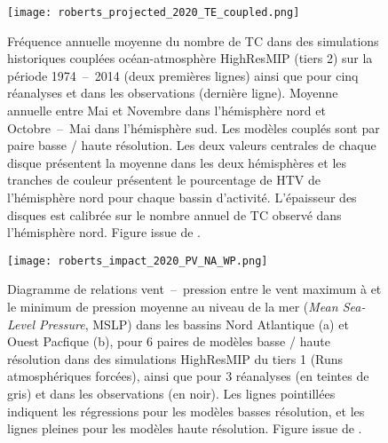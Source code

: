 \documentclass[../main.tex]{subfiles}
\begin{document}
\begin{figure}[tb]
    \centering
    \texttt{[image: roberts\_projected\_2020\_TE\_coupled.png]}
    \caption{Fréquence annuelle moyenne du nombre de TC dans des simulations historiques couplées océan-atmosphère HighResMIP (tiers 2) sur la période
        \num{1974}~--~\num{2014} (deux premières lignes) ainsi que pour cinq réanalyses et dans les observations (dernière ligne). Moyenne annuelle entre Mai et
        Novembre dans l'hémisphère nord et Octobre~--~Mai dans l'hémisphère sud. Les modèles couplés sont par paire basse / haute résolution. Les deux valeurs
        centrales de chaque disque présentent la moyenne dans les deux hémisphères et les tranches de couleur présentent le pourcentage de HTV de l'hémisphère
        nord pour chaque bassin d'activité. L'épaisseur des disques est calibrée sur le nombre annuel de TC observé dans l'hémisphère nord. Figure issue de
        \hbox{\cite{roberts_projected_2020}}.}
        \label{fig:NTC_HighResMIP}
\end{figure}
\begin{figure}[tb]
    \centering
    \texttt{[image: roberts\_impact\_2020\_PV\_NA\_WP.png]}
    \caption{Diagramme de relations vent~--~pression entre le vent maximum à  et le minimum de pression moyenne au niveau de la mer (\textit{Mean
        Sea-Level Pressure}, MSLP) dans les bassins Nord Atlantique (a) et Ouest Pacfique (b), pour \num{6} paires de modèles basse / haute résolution dans des
        simulations HighResMIP du tiers \num{1} (Runs atmosphériques forcées), ainsi que pour \num{3} réanalyses (en teintes de gris) et dans les observations
        (en noir). Les lignes pointillées indiquent les régressions pour les modèles basses résolution, et les lignes pleines pour les modèles haute résolution.
        Figure issue de \hbox{\cite{roberts_impact_2020}}.}
    \label{fig:roberts_PV_resolution}
\end{figure}
\end{document}
